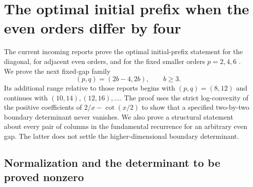\section{The optimal initial prefix when the even orders differ by four}
\label{eg:section}

The current incoming reports prove the optimal initial-prefix statement
for the diagonal, for adjacent even orders, and for the fixed smaller
orders $p=2,4,6$ \cite{Canonical,Differential,Bernoulli,Polygamma}.
We prove the next fixed-gap family
\[
                    (p,q)=(2b-4,2b),\qquad b\ge3.
\]
Its additional range relative to those reports begins with $(p,q)=(8,12)$ and continues
with $(10,14),(12,16),\ldots$. The proof uses the strict log-convexity
of the positive coefficients of $2/x-\cot(x/2)$ to show that a
specified two-by-two boundary determinant never vanishes. We also
prove a structural statement about every pair of columns in the
fundamental recurrence for an arbitrary even gap. The latter does
not settle the higher-dimensional boundary determinant.

\subsection{Normalization and the determinant to be proved nonzero}

